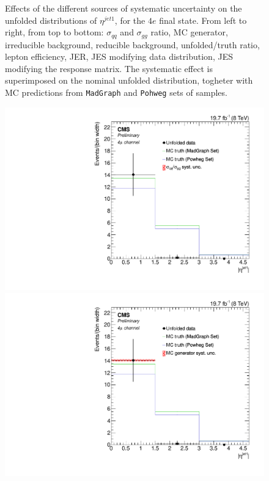 \begin{figure}[hbtp]
\begin{center}
   \caption{Effects of the different sources of systematic uncertainty on the unfolded distributions of  $\eta^{jet1}$, for the     
   $4e$ final state. From left to right, from top to bottom: $\sigma_{qq}$ and $\sigma_{gg}$ ratio, MC generator, irreducible background, reducible background, unfolded/truth ratio, lepton efficiency, JER, JES modifying data distribution, JES modifying the response matrix. The systematic effect is superimposed on the nominal unfolded distribution, togheter with MC predictions from \texttt{MadGraph} and \texttt{Pohweg} sets of samples.}
   \label{fig:EtaJet1_syst_4e}
 \end{center}
\end{figure}
\clearpage
\begin{figure}[hbtp]
 \begin{center}
   \includegraphics[width=0.8\cmsFigWidth]{Figures/Unfolding/Systematics/ZZTo4m_EtaJet1_qqgg_Mad_fr}     
   \includegraphics[width=0.8\cmsFigWidth]{Figures/Unfolding/Systematics/ZZTo4m_EtaJet1_MCgen_Mad_fr}     

\end{center}
\end{figure}
